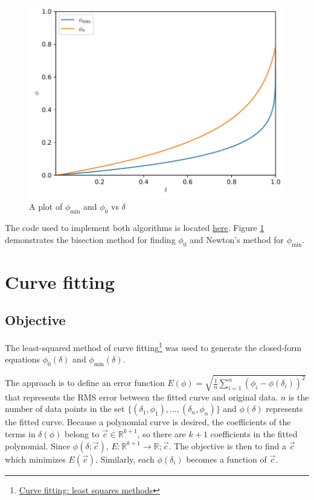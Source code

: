 \begin{figure}[H]
    \centering
    \includegraphics[]{plots/phi-functions.pdf}
    \caption{A plot of $\phi_\mathrm{min}$ and $\phi_0$ vs $\delta$}\label{phifig}
\end{figure}

The code used to implement both algorithms is located \href{https://gist.github.com/sidnb13/d715682a9915ec4cf49d66ceb2e54855}{here}. Figure \ref{phifig} demonstrates the bisection method for finding $\phi_0$ and Newton's method for $\phi_\mathrm{min}$.

\section{Curve fitting}

\subsection{Objective}

The least-squared method of curve fitting\footnote{\href{https://www.dam.brown.edu/people/alcyew/handouts/leastsq.pdf}{Curve fitting: least squares methods}} was used to generate the closed-form equations $\phi_0(\delta)$ and $\phi_\mathrm{min}(\delta)$.

The approach is to define an error function $E(\phi)=\sqrt{\frac{1}{n}\sum_{i=1}^n(\phi_i-\phi(\delta_i))^2}$ that represents the RMS error between the fitted curve and original data. $n$ is the number of data points in the set $\{(\delta_1,\phi_1),\ldots,(\delta_n,\phi_n)\}$ and $\phi(\delta)$ represents the fitted curve.
Because a polynomial curve is desired, the coefficients of the terms in $\delta(\phi)$ belong to $\vec c\in \mathbb{R}^{k+1}$, so there are $k+1$ coefficients in the fitted polynomial. Since $\phi(\delta;\vec{c})$, $E:\mathbb{R}^{k+1}\to \mathbb{R};\vec{c}$. The objective is then to find a $\vec{c}$ which minimizes $E(\vec{c})$. Similarly, each $\phi(\delta_i)$ becomes a function of $\vec{c}$.

